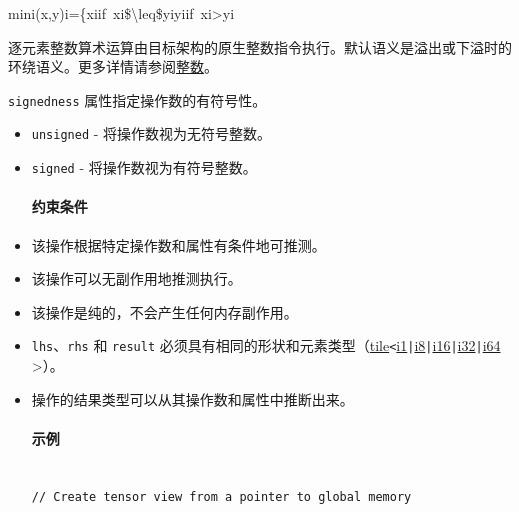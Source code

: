 \documentclass{article}
\begin{document}
mini(x,y)i=\{xiif xi\$\textbackslash{}leq\$yiyiif xi>yi


逐元素整数算术运算由目标架构的原生整数指令执行。默认语义是溢出或下溢时的环绕语义。更多详情请参阅\href{https://docs.nvidia.com/cuda/tile-ir/latest/sections/operations.html#op-group-integer}{整数}。



\texttt{signedness} 属性指定操作数的有符号性。



\begin{itemize}
\item \texttt{unsigned} - 将操作数视为无符号整数。
\item \texttt{signed} - 将操作数视为有符号整数。




\paragraph{约束条件}


\item 该操作根据特定操作数和属性有条件地可推测。
\item 该操作可以无副作用地推测执行。
\item 该操作是纯的，不会产生任何内存副作用。
\item \texttt{lhs}、\texttt{rhs} 和 \texttt{result} 必须具有相同的形状和元素类型（\href{https://docs.nvidia.com/cuda/tile-ir/latest/sections/types.html#type-tile}{tile}\texttt{<}\href{https://docs.nvidia.com/cuda/tile-ir/latest/sections/types.html#subsection-element-types}{i1}\texttt{|}\href{https://docs.nvidia.com/cuda/tile-ir/latest/sections/types.html#subsection-element-types}{i8}\texttt{|}\href{https://docs.nvidia.com/cuda/tile-ir/latest/sections/types.html#subsection-element-types}{i16}\texttt{|}\href{https://docs.nvidia.com/cuda/tile-ir/latest/sections/types.html#subsection-element-types}{i32}\texttt{|}\href{https://docs.nvidia.com/cuda/tile-ir/latest/sections/types.html#subsection-element-types}{i64} >）。
\item 操作的结果类型可以从其操作数和属性中推断出来。




\paragraph{示例}


\begin{lstlisting}

// Create tensor view from a pointer to global memory


\end{lstlisting}
\end{itemize}
\end{document}
